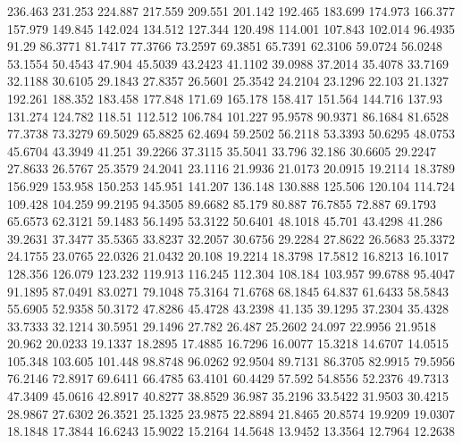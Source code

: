 236.463      231.253      224.887      217.559      209.551      201.142      192.465      183.699      174.973      166.377      157.979      149.845      142.024      134.512      127.344      120.498      114.001      107.843      102.014      96.4935      91.29      86.3771      81.7417      77.3766      73.2597      69.3851      65.7391      62.3106      59.0724      56.0248      53.1554      50.4543      47.904      45.5039      43.2423      41.1102      39.0988      37.2014      35.4078      33.7169      32.1188      30.6105      29.1843      27.8357      26.5601      25.3542      24.2104      23.1296      22.103      21.1327      
192.261      188.352      183.458      177.848      171.69      165.178      158.417      151.564      144.716      137.93      131.274      124.782      118.51      112.512      106.784      101.227      95.9578      90.9371      86.1684      81.6528      77.3738      73.3279      69.5029      65.8825      62.4694      59.2502      56.2118      53.3393      50.6295      48.0753      45.6704      43.3949      41.251      39.2266      37.3115      35.5041      33.796      32.186      30.6605      29.2247      27.8633      26.5767      25.3579      24.2041      23.1116      21.9936      21.0173      20.0915      19.2114      18.3789      
156.929      153.958      150.253      145.951      141.207      136.148      130.888      125.506      120.104      114.724      109.428      104.259      99.2195      94.3505      89.6682      85.179      80.887      76.7855      72.887      69.1793      65.6573      62.3121      59.1483      56.1495      53.3122      50.6401      48.1018      45.701      43.4298      41.286      39.2631      37.3477      35.5365      33.8237      32.2057      30.6756      29.2284      27.8622      26.5683      25.3372      24.1755      23.0765      22.0326      21.0432      20.108      19.2214      18.3798      17.5812      16.8213      16.1017      
128.356      126.079      123.232      119.913      116.245      112.304      108.184      103.957      99.6788      95.4047      91.1895      87.0491      83.0271      79.1048      75.3164      71.6768      68.1845      64.837      61.6433      58.5843      55.6905      52.9358      50.3172      47.8286      45.4728      43.2398      41.135      39.1295      37.2304      35.4328      33.7333      32.1214      30.5951      29.1496      27.782      26.487      25.2602      24.097      22.9956      21.9518      20.962      20.0233      19.1337      18.2895      17.4885      16.7296      16.0077      15.3218      14.6707      14.0515      
105.348      103.605      101.448      98.8748      96.0262      92.9504      89.7131      86.3705      82.9915      79.5956      76.2146      72.8917      69.6411      66.4785      63.4101      60.4429      57.592      54.8556      52.2376      49.7313      47.3409      45.0616      42.8917      40.8277      38.8529      36.987      35.2196      33.5422      31.9503      30.4215      28.9867      27.6302      26.3521      25.1325      23.9875      22.8894      21.8465      20.8574      19.9209      19.0307      18.1848      17.3844      16.6243      15.9022      15.2164      14.5648      13.9452      13.3564      12.7964      12.2638      
